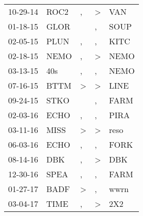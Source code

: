 \begin{supertabular}{p{0.07\textwidth}p{0.06\textwidth}p{0.02\textwidth}p{0.02\textwidth}p{0.06\textwidth}}
          10-29-14\textsuperscript{} &           ROC2\textsuperscript{} &                , &     \textgreater &            VAN\textsuperscript{} \\
          01-18-15\textsuperscript{} &           GLOR\textsuperscript{} &                  &                , &           SOUP\textsuperscript{} \\
          02-05-15\textsuperscript{} &           PLUN\textsuperscript{} &                , &                , &           KITC\textsuperscript{} \\
          02-18-15\textsuperscript{} &           NEMO\textsuperscript{} &                , &     \textgreater &           NEMO\textsuperscript{} \\
          03-13-15\textsuperscript{} &            40s\textsuperscript{} &                , &                , &           NEMO\textsuperscript{} \\
          07-16-15\textsuperscript{} &           BTTM\textsuperscript{} &     \textgreater &     \textgreater &           LINE\textsuperscript{} \\
          09-24-15\textsuperscript{} &           STKO\textsuperscript{} &                  &                , &           FARM\textsuperscript{} \\
          02-03-16\textsuperscript{} &           ECHO\textsuperscript{} &                , &                , &           PIRA\textsuperscript{} \\
          03-11-16\textsuperscript{} &           MISS\textsuperscript{} &     \textgreater &     \textgreater &           reso\textsuperscript{} \\
          06-03-16\textsuperscript{} &           ECHO\textsuperscript{} &                , &                , &           FORK\textsuperscript{} \\
          08-14-16\textsuperscript{} &            DBK\textsuperscript{} &                , &     \textgreater &            DBK\textsuperscript{} \\
          12-30-16\textsuperscript{} &           SPEA\textsuperscript{} &                , &                , &           FARM\textsuperscript{} \\
          01-27-17\textsuperscript{} &           BADF\textsuperscript{} &     \textgreater &                , &           wwrn\textsuperscript{} \\
          03-04-17\textsuperscript{} &           TIME\textsuperscript{} &                , &     \textgreater &            2X2\textsuperscript{} \\

\end{supertabular}
